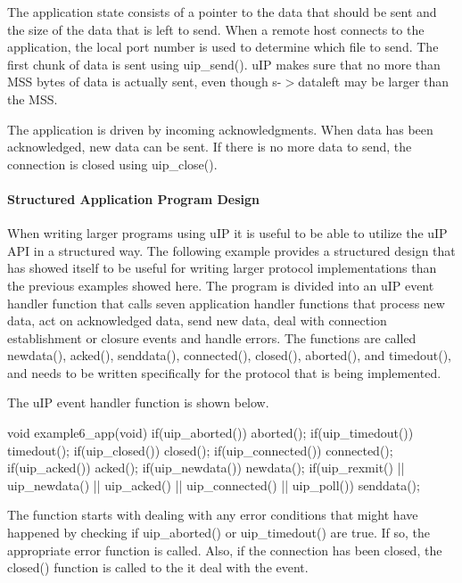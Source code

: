 \-The application state consists of a pointer to the data that should be sent and the size of the data that is left to send. \-When a remote host connects to the application, the local port number is used to determine which file to send. \-The first chunk of data is sent using uip\-\_\-send(). u\-I\-P makes sure that no more than \-M\-S\-S bytes of data is actually sent, even though s-\/$>$dataleft may be larger than the \-M\-S\-S.

\-The application is driven by incoming acknowledgments. \-When data has been acknowledged, new data can be sent. \-If there is no more data to send, the connection is closed using uip\-\_\-close().\hypertarget{a00060_example6}{}\paragraph{\-Structured Application Program Design}\label{a00060_example6}
\-When writing larger programs using u\-I\-P it is useful to be able to utilize the u\-I\-P \-A\-P\-I in a structured way. \-The following example provides a structured design that has showed itself to be useful for writing larger protocol implementations than the previous examples showed here. \-The program is divided into an u\-I\-P event handler function that calls seven application handler functions that process new data, act on acknowledged data, send new data, deal with connection establishment or closure events and handle errors. \-The functions are called newdata(), acked(), senddata(), connected(), closed(), aborted(), and timedout(), and needs to be written specifically for the protocol that is being implemented.

\-The u\-I\-P event handler function is shown below.


\begin{DoxyCode}
void example6_app(void) {
  if(uip_aborted()) {
    aborted();
  }
  if(uip_timedout()) {
    timedout();
  }
  if(uip_closed()) {
    closed();
  }
  if(uip_connected()) {
    connected();
  }
  if(uip_acked()) {
    acked();
  }
  if(uip_newdata()) {
    newdata();
  }
  if(uip_rexmit() ||
     uip_newdata() ||
     uip_acked() ||
     uip_connected() ||
     uip_poll()) {
    senddata();
  }
}
\end{DoxyCode}


\-The function starts with dealing with any error conditions that might have happened by checking if uip\-\_\-aborted() or uip\-\_\-timedout() are true. \-If so, the appropriate error function is called. \-Also, if the connection has been closed, the closed() function is called to the it deal with the event.

